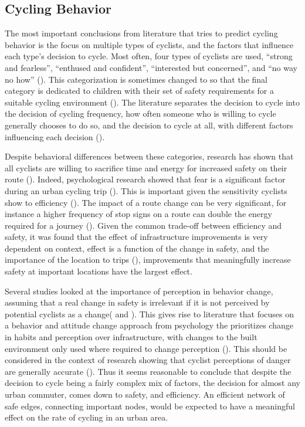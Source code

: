 
\subsection{Cycling Behavior}

The most important conclusions from literature that tries to predict cycling behavior is the focus on multiple types of cyclists, and the factors that influence each type's decision to cycle. Most often, four types of cyclists are used, ``strong and fearless'', ``enthused and confident'', ``interested but concerned'', and ``no way no how'' (\cite{dill2013four}). This categorization is sometimes changed to so that the final category is dedicated to children with their set of safety requirements for a suitable cycling environment (\cite{mekuria2012low}). The literature separates the decision to cycle into the decision of cycling frequency, how often someone who is willing to cycle generally chooses to do so, and the decision to cycle at all, with different factors influencing each decision (\cite{stinson2005comparison}). 

Despite behavioral differences between these categories, research has shown that all cyclists are willing to sacrifice time and energy for increased safety on their route (\cite{winters2011motivators}). Indeed, psychological research showed that fear is a significant factor during an urban cycling trip (\cite{ellett2018state}). This is important given the sensitivity cyclists show to efficiency (\cite{wuerzer2015cycling}). The impact of a route change can be very significant, for instance a higher frequency of stop signs on a route can double the energy required for a journey (\cite{fajans2001bicyclists}). Given the common trade-off between efficiency and safety, it was found that the effect of infrastructure improvements is very dependent on context, effect is a function of the change in safety, and the importance of the location to trips (\cite{kondo2018bike}), improvements that meaningfully increase safety at important locations have the largest effect. 

Several studies looked at the importance of perception in behavior change, assuming that a real change in safety is irrelevant if it is not perceived by potential cyclists as a change(\cite{li2012physical} and \cite{parkin2007models}). This gives rise to literature that focuses on a behavior and attitude change approach from psychology the prioritizes change in habits and perception over infrastructure, with changes to the built environment only used where required to change perception (\cite{savan2017integrated}). This should be considered in the context of research showing that cyclist perceptions of danger are generally accurate (\cite{vandenbulcke2014predicting}). Thus it seems reasonable to conclude that despite the decision to cycle being a fairly complex mix of factors, the decision for almost any urban commuter, comes down to safety, and efficiency. An efficient network of safe edges, connecting important nodes, would be expected to have a meaningful effect on the rate of cycling in an urban area.  

